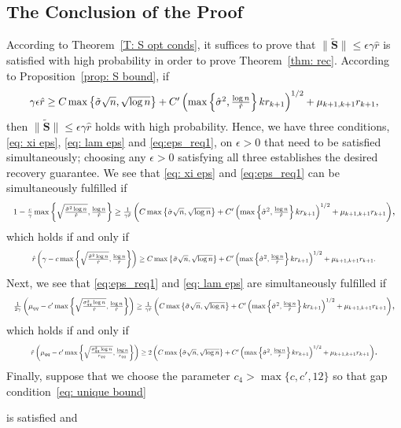 \documentclass[twoside,11pt]{article}
\newcommand{\St}{\bs{\tilde S}}
\newcommand{\bs}{\boldsymbol}
\newcommand{\0}{\bs{0}}
\newcommand{\rbra}[1]{\ensuremath{\left( #1 \right)}} %
\newcommand{\bra}[1]{\ensuremath{\left\{ #1 \right\}}} %
\begin{document}
{\subsection{The Conclusion of the Proof}
\label{sec: wrap}
According to Theorem~\ref{T: S opt conds}, it suffices to prove that
$\|\St\| \leq \epsilon \gamma \hat{r}$ is satisfied with high probability in order to prove Theorem~\ref{thm: rec}.
According to Proposition~\ref{prop: S bound}, if
\begin{equation} \label{eq:eps_req1}
\resizebox{0.92\textwidth}{!}{$
	\gamma\epsilon \hat r \geq  C \max\left\lbrace \tilde \sigma \sqrt{n},  \sqrt{\log n} \right\rbrace
+ C' \rbra{ \max \bra{\hat\sigma^2, \frac{\log n}{\hat r} } k r_{k+1} }^{1/2} + \mu_{k+1, k+1} r_{k+1},
	$}
\end{equation}
then $\|\St\| \leq \epsilon \gamma \hat{r}$ holds with high probability.
Hence, we have three conditions, \eqref{eq: xi eps}, \eqref{eq: lam eps} and \eqref{eq:eps_req1}, on $\epsilon > 0$ that need to be satisfied simultaneously;
choosing any \(\epsilon > 0\) satisfying all three establishes the desired recovery guarantee.
We see that   \eqref{eq: xi eps} and \eqref{eq:eps_req1} can be simultaneously fulfilled if
\[ \resizebox{\textwidth}{!}{\(
	1 - \frac{c}{\gamma}\max \bra{ \sqrt{ \frac{\tilde \sigma^2 \log n}{\hat r}} ,
			\frac{\log n}{\hat r}}
			\geq
			\frac{1}{\gamma \hat{r}}\left( C \max\left\lbrace \tilde \sigma \sqrt{n},  \sqrt{\log n} \right\rbrace
		+ C' \rbra{ \max \bra{\hat\sigma^2, \frac{\log n}{\hat r} } k r_{k+1} }^{1/2} + \mu_{k+1, k+1} r_{k+1}\right) \)},
\]
which holds if and only if
\begin{equation} \label{eq:general_low_bound_r}
\resizebox{0.91\textwidth}{!}{\(
	 \hat r \rbra{\gamma - c \max \bra{ \sqrt{ \frac{\tilde \sigma^2 \log n}{\hat r}} , \frac{\log n}{\hat r} }  }
			\geq   C \max\left\lbrace \tilde \sigma \sqrt{n},  \sqrt{\log n} \right\rbrace
		+ C' \rbra{ \max \bra{\hat\sigma^2, \frac{\log n}{\hat r} } k r_{k+1} }^{1/2} + \mu_{k+1, k+1} r_{k+1}.
\)}
\end{equation}
Next, we see that \eqref{eq:eps_req1} and \eqref{eq: lam eps} are simultaneously fulfilled if
\[
\resizebox{\textwidth}{!}{\(
		\frac{1}{2\gamma} \rbra{ \mu_{qq}  - c' \max \bra{ \sqrt{  \frac{\sigma_{qq}^2 \log n }{\hat r} }, \frac{\log n }{\hat r} }  }
			\geq
			\frac{1}{\gamma \hat{r}} \rbra{  C \max\left\lbrace \tilde \sigma \sqrt{n},  \sqrt{\log n} \right\rbrace
		+ C' \rbra{ \max \bra{\hat\sigma^2, \frac{\log n}{\hat r} } k r_{k+1} }^{1/2} + \mu_{k+1, k+1} r_{k+1} }
\)},
\]
which holds if and only if
\begin{equation} \label{eq:general:low_bound_r2}
\resizebox{0.91\textwidth}{!}{\(
	\hat r \rbra{ \mu_{qq}  - c' \max \bra{ \sqrt{  \frac{\sigma_{qq}^2 \log n }{r_{qq}} }, \frac{\log n }{r_{qq}} }  }
			\geq
			 2\rbra{  C \max\left\lbrace \tilde \sigma \sqrt{n},  \sqrt{\log n} \right\rbrace
	 + C' \rbra{ \max \bra{\hat\sigma^2, \frac{\log n}{\hat r} } k r_{k+1} }^{1/2} + \mu_{k+1, k+1} r_{k+1} }
\)}.
\end{equation}
Finally, suppose that we choose the parameter $c_4 > \max\{c, c', 12\}$ so that gap condition~\eqref{eq: unique bound}} is satisfied  and
\end{document}
